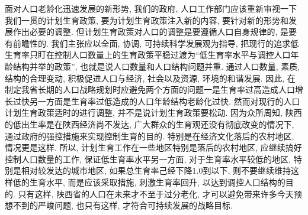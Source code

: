 \documentclass[a4paper, 12pt, UTF8]{article}
\begin{document}
面对人口老龄化迅速发展的新形势, 我们的政府, 人口工作部门应该重新审视一下我们一贯的计划生育政策, 要为计划生育政策注入新的内容, 要针对新的形势和发展作出必要的调整. 但计划生育政策对人口的调整是要遵循人口自身规律的, 是要有前瞻性的. 我们主张应以全面, 协调, 可持续科学发展观为指导, 把现行的追求低生育率只盯在控制人口数量上的生育政策平稳过渡为“低生育率水平与调控人口年龄结构并举的政策”, 也就是说人口数量和人口结构问题并重. 通过人口数量, 素质, 结构的合理变动, 积极促进人口与经济, 社会以及资源, 环境的和谐发展. 因此, 在制定我省长期的人口战略规划时应避免两个方面的问题一是生育率过高造成人口增长过快另一方面是生育率过低造成的人口年龄结构老龄化过快. 然而对现行的人口计划生育政策适时的进行调整, 并不是说计划生育政策要松动. 因为众所周知, 陕西的低出生率是在陕西经济尚不发达, 广大群众的生育观还没有彻底改变的情况下, 通过政府的强控措施来实现控制生育的目的. 特别是在经济文化落后的农村地区, 情况更是这样. 所以, 计划生育工作在一些地区特别是落后的农村地区, 应继续搞好控制人口数量的工作, 保证低生育率水平另一方面, 对于生育率水平较低的地区, 特别是相对较发达的城市地区, 如果总生育率己经下降1.0到以下, 则不要继续维持这样低的生育水平, 而是应该采取措施, 刺激生育率回升, 以达到调控人口结构的目的. 只有这样, 陕西省的人口在未来才不至于过分老化, 才可以避免带来许多今天预想不到的严峻问题, 也只有这样, 才符合可持续发展的战略目标. 

\newpage
\nocite{*}


\end{document}
